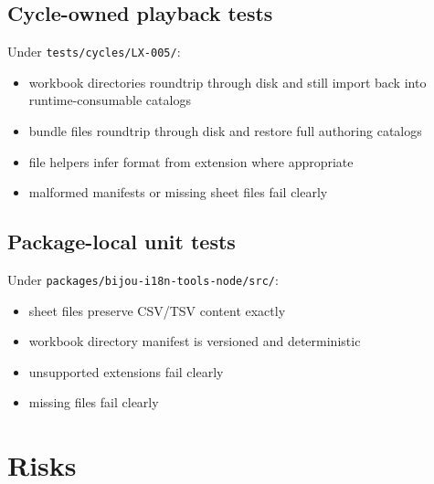 \subsection{Cycle-owned playback tests}\label{record-192-cycle-owned-playback-tests}

Under \texttt{t\allowbreak{}e\allowbreak{}s\allowbreak{}t\allowbreak{}s\allowbreak{}/\allowbreak{}c\allowbreak{}y\allowbreak{}c\allowbreak{}l\allowbreak{}e\allowbreak{}s\allowbreak{}/\allowbreak{}L\allowbreak{}X\allowbreak{}-\allowbreak{}0\allowbreak{}0\allowbreak{}5\allowbreak{}/}:

\begin{itemize}
\tightlist
\item
  workbook directories roundtrip through disk and still import back into runtime-consumable catalogs
\item
  bundle files roundtrip through disk and restore full authoring catalogs
\item
  file helpers infer format from extension where appropriate
\item
  malformed manifests or missing sheet files fail clearly
\end{itemize}

\subsection{Package-local unit tests}\label{record-192-package-local-unit-tests}

Under \texttt{p\allowbreak{}a\allowbreak{}c\allowbreak{}k\allowbreak{}a\allowbreak{}g\allowbreak{}e\allowbreak{}s\allowbreak{}/\allowbreak{}b\allowbreak{}i\allowbreak{}j\allowbreak{}o\allowbreak{}u\allowbreak{}-\allowbreak{}i\allowbreak{}1\allowbreak{}8\allowbreak{}n\allowbreak{}-\allowbreak{}t\allowbreak{}o\allowbreak{}o\allowbreak{}l\allowbreak{}s\allowbreak{}-\allowbreak{}n\allowbreak{}o\allowbreak{}d\allowbreak{}e\allowbreak{}/\allowbreak{}s\allowbreak{}r\allowbreak{}c\allowbreak{}/}:

\begin{itemize}
\tightlist
\item
  sheet files preserve CSV/TSV content exactly
\item
  workbook directory manifest is versioned and deterministic
\item
  unsupported extensions fail clearly
\item
  missing files fail clearly
\end{itemize}

\section{Risks}\label{record-192-risks}

